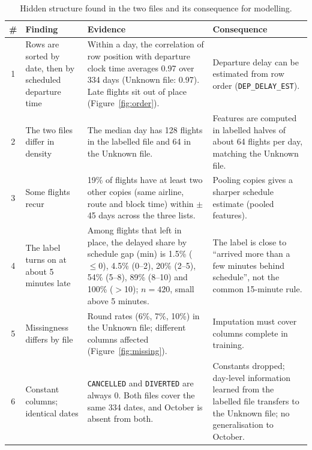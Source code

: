 \documentclass[12pt,a4paper]{article}
\newcommand{\code}[1]{\texttt{\small #1}}
\begin{document}
\begin{table}[t]
\caption{Hidden structure found in the two files and its consequence for modelling.}\label{tab:hidden}
\small\centering
\begin{tabular}{@{}c R{0.17\textwidth} R{0.40\textwidth} R{0.31\textwidth}@{}}
\toprule
\# & Finding & Evidence & Consequence\\
 & Rows are sorted by date, then by scheduled departure time & Within a day, the correlation of row position with departure clock time averages 0.97 over 334 days (Unknown file: 0.97). Late flights sit out of place (Figure~\ref{fig:order}). & Departure delay can be estimated from row order (\code{DEP\_DELAY\_EST}).\\
2 & The two files differ in density & The median day has 128 flights in the labelled file and 64 in the Unknown file. & Features are computed in labelled halves of about 64 flights per day, matching the Unknown file.\\
3 & Some flights recur & 19\% of flights have at least two other copies (same airline, route and block time) within $\pm$45 days across the three lists. & Pooling copies gives a sharper schedule estimate (pooled features).\\
4 & The label turns on at about 5 minutes late & Among flights that left in place, the delayed share by schedule gap (min) is 1.5\% ($\le 0$), 4.5\% (0--2), 20\% (2--5), 54\% (5--8), 89\% (8--10) and 100\% ($>$10); $n = 420$, small above 5 minutes. & The label is close to ``arrived more than a few minutes behind schedule'', not the common 15-minute rule.\\
5 & Missingness differs by file & Round rates (6\%, 7\%, 10\%) in the Unknown file; different columns affected (Figure~\ref{fig:missing}). & Imputation must cover columns complete in training.\\
6 & Constant columns; identical dates & \code{CANCELLED} and \code{DIVERTED} are always 0. Both files cover the same 334 dates, and October is absent from both. & Constants dropped; day-level information learned from the labelled file transfers to the Unknown file; no generalisation to October.\\
\bottomrule
\end{tabular}
\end{table}
\end{document}
